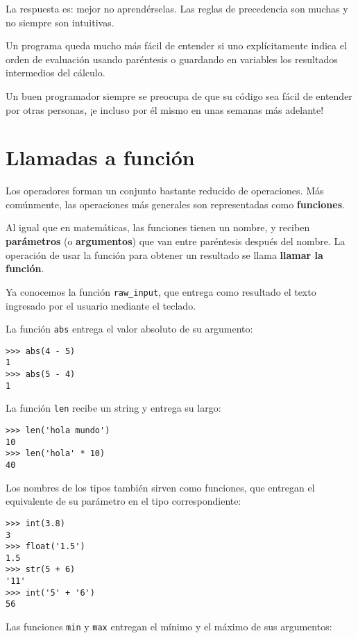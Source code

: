 La respuesta es: mejor no aprendérselas. Las reglas de precedencia son
muchas y no siempre son intuitivas.

Un programa queda mucho más fácil de entender si uno explícitamente
indica el orden de evaluación usando paréntesis o guardando en variables
los resultados intermedios del cálculo.

Un buen programador siempre se preocupa de que su código sea fácil de
entender por otras personas, ¡e incluso por él mismo en unas semanas más
adelante!

\section{Llamadas a función}

Los operadores forman un conjunto bastante reducido de operaciones. Más
comúnmente, las operaciones más generales son representadas como
\textbf{funciones}.

Al igual que en matemáticas, las funciones tienen un nombre, y reciben
\textbf{parámetros} (o \textbf{argumentos}) que van entre paréntesis
después del nombre. La operación de usar la función para obtener un
resultado se llama \textbf{llamar la función}.

Ya conocemos la función \lstinline!raw_input!, que entrega como
resultado el texto ingresado por el usuario mediante el teclado.

La función \lstinline!abs! entrega el valor absoluto de su argumento:

\begin{lstlisting}
>>> abs(4 - 5)
1
>>> abs(5 - 4)
1
\end{lstlisting}

La función \lstinline!len! recibe un string y entrega su largo:

\begin{lstlisting}
>>> len('hola mundo')
10
>>> len('hola' * 10)
40
\end{lstlisting}

Los nombres de los tipos también sirven como funciones, que entregan el
equivalente de su parámetro en el tipo correspondiente:

\begin{lstlisting}
>>> int(3.8)
3
>>> float('1.5')
1.5
>>> str(5 + 6)
'11'
>>> int('5' + '6')
56
\end{lstlisting}

Las funciones \lstinline!min! y \lstinline!max! entregan el mínimo y el
máximo de sus argumentos:

